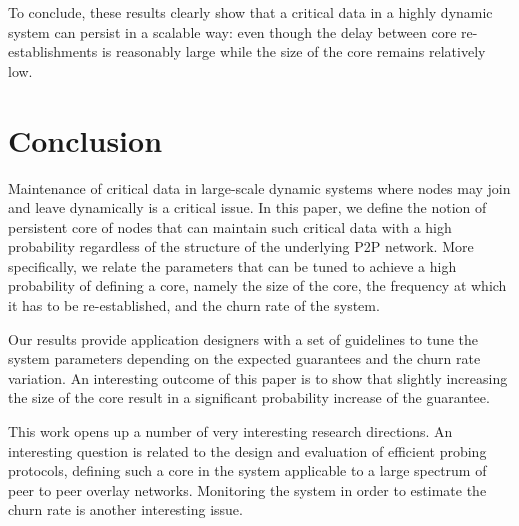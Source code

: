 \documentclass[]{llncs}
\begin{document}
To conclude, these results clearly show that a critical data
in a highly dynamic system can persist in a scalable way: 
even though the delay between core re-establishments is reasonably 
large while the  size  of the  core remains  relatively low. 



\section{Conclusion}
\label{sec:discussion}

Maintenance of critical data in large-scale dynamic systems where nodes 
may join and leave dynamically is a critical issue. In this paper, 
we define the notion of persistent core of nodes that can
maintain such critical data  with a high probability regardless of 
the structure of the underlying P2P network.  
More specifically, we relate
the parameters that can be tuned to achieve a high probability of 
defining a core, namely the size of the core, the
frequency at which it has to be re-established, and the churn rate 
of the system.

Our results provide application designers with a set of guidelines 
to tune the system
parameters depending on the expected guarantees and the churn rate variation.
An interesting outcome of this paper is
to 
show that slightly increasing the size of the core result in a significant 
probability increase of the guarantee. 

This work opens up a number of very interesting research directions. 
An interesting question
is related to the design and evaluation of efficient probing protocols, defining such a core in the system
applicable to a large spectrum of peer to peer overlay networks.  
Monitoring the system 
in order to estimate the churn rate is another interesting issue.



\end{document}
